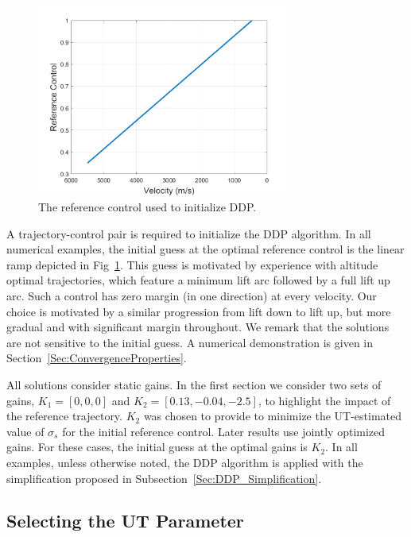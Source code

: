 \begin{figure}[h!]
	\centering
	\includegraphics[width=0.75\textwidth]{Images/GuessControl}
	\caption{The reference control used to initialize DDP.}
	\label{Fig:GuessControl}
\end{figure}
A trajectory-control pair is required to initialize the DDP algorithm. In all numerical examples, the initial guess at the optimal reference control is the linear ramp depicted in Fig~\ref{Fig:GuessControl}. This guess is motivated by experience with altitude optimal trajectories, which feature a minimum lift arc followed by a full lift up arc. Such a control has zero margin (in one direction) at every velocity. Our choice is motivated by a similar progression from lift down to lift up, but more gradual and with significant margin throughout. We remark that the solutions are not sensitive to the initial guess. A numerical demonstration is given in Section~\ref{Sec:ConvergenceProperties}.

All solutions consider static gains. In the first section we consider two sets of gains, $K_1=[0,0,0]$ and $K_2 = [0.13,-0.04,-2.5]$, to highlight the impact of the reference trajectory. $K_2$ was chosen to provide to minimize the UT-estimated value of $\sigma_s$ for the initial reference control. Later results use jointly optimized gains. For these cases, the initial guess at the optimal gains is $K_2$. In all examples, unless otherwise noted, the DDP algorithm is applied with the simplification proposed in Subsection~\ref{Sec:DDP_Simplification}.

\subsection{Selecting the UT Parameter}

